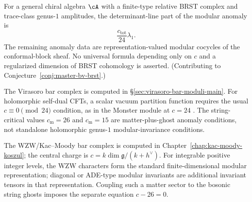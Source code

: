 \begin{conjecture}
\label{conj:modular-anomaly-brst}
For a general chiral algebra $\cA$ with a finite-type relative BRST
complex and trace-class genus-$1$ amplitudes, the determinant-line
part of the modular anomaly is
\[
\frac{c_{\mathrm{tot}}}{24}\lambda_1.
\]
The remaining anomaly data are representation-valued modular
cocycles of the conformal-block sheaf. No universal formula depending
only on $c$ and a regularized dimension of BRST cohomology is asserted.
(Contributing to Conjecture~\ref{conj:master-bv-brst}.)
\end{conjecture}


\begin{example}
The Virasoro bar complex is computed in
\S\ref{sec:virasoro-bar-moduli-main}. For holomorphic self-dual CFTs,
a scalar vacuum partition function requires the usual
$c\equiv0\pmod{24}$ condition, as in the Monster module at $c=24$
\cite{FLM88}. The string-critical values $c_{\mathrm m}=26$ and
$c_{\mathrm m}=15$ are matter-plus-ghost anomaly conditions, not
standalone holomorphic genus-$1$ modular-invariance conditions.
\end{example}

\begin{example}
The WZW/Kac--Moody bar complex is computed in Chapter~\ref{chap:kac-moody-koszul}; the central charge is $c = k\dim\mathfrak{g}/(k + h^\vee)$.
For integrable positive integer levels, the WZW characters form the
standard finite-dimensional modular representation; diagonal or
ADE-type modular invariants are additional invariant tensors in that
representation. Coupling such a matter sector to the bosonic string
ghosts imposes the separate equation $c-26=0$.
\end{example}

